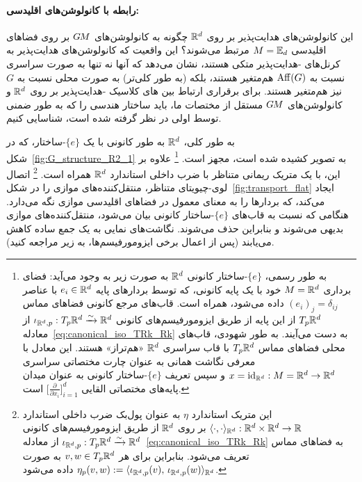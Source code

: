 \paragraph{رابطه با کانولوشن‌های  اقلیدسی:}
این کانولوشن‌های هدایت‌پذیر بر روی $\mathbb{R}^d$ چگونه به کانولوشن‌های $G\mkern-1.4muM$ بر روی فضاهای اقلیدسی ${M = \mathbb{E}_d}$ مرتبط می‌شوند؟
این واقعیت که کانولوشن‌های هدایت‌پذیر به کرنل‌های -هدایت‌پذیر متکی هستند، نشان می‌دهد که آنها نه تنها به صورت سراسری نسبت به $\operatorname{Aff}(G)$ هم‌متغیر هستند، بلکه (به طور کلی‌تر) به صورت محلی نسبت به $G$ نیز هم‌متغیر هستند.
برای برقراری ارتباط بین های کلاسیک -هدایت‌پذیر بر روی $\mathbb{R}^d$ و کانولوشن‌های $G\mkern-1.4muM$ مستقل از مختصات ما، باید ساختار هندسی را که به طور ضمنی توسط اولی در نظر گرفته شده است، شناسایی کنیم.


به طور کلی، $\mathbb{R}^d$ به طور کانونی با یک $\{e\}$-ساختار، که در شکل~\ref{fig:G_structure_R2_1} به تصویر کشیده شده است، مجهز است.%
\footnote{
	به طور رسمی، $\{e\}$-ساختار کانونی $\mathbb{R}^d$ به صورت زیر به وجود می‌آید:
	فضای برداری $M=\mathbb{R}^d$ خود با یک پایه کانونی، که توسط بردارهای پایه $e_i \in \mathbb{R}^d$ با عناصر $(e_i)_j = \delta_{ij}$ داده می‌شود، همراه است.
	قاب‌های مرجع کانونی فضاهای مماس $T_p\mathbb{R}^d$ از این پایه از طریق ایزومورفیسم‌های کانونی
	$\iota_{\mathbb{R}^d,p}: T_p{\mathbb{R}^d} \xrightarrow{\sim} \mathbb{R}^d$ از معادله~\eqref{eq:canonical_iso_TRk_Rk} به دست می‌آیند.
	به طور شهودی، قاب‌های محلی فضاهای مماس $T_p\mathbb{R}^d$ با قاب سراسری $\mathbb{R}^d$ «هم‌تراز» هستند.
	این معادل با معرفی نگاشت همانی به عنوان چارت مختصاتی سراسری $x = \mathrm{id}_{\mathbb{R}^d} : M=\mathbb{R}^d \to \mathbb{R}^d$ و سپس تعریف $\{e\}$-ساختار کانونی به عنوان میدان پایه‌های مختصاتی القایی $\big[\frac{\partial}{\partial x_i} \big]_{i=1}^d$ است.
}
علاوه بر این، با یک متریک ریمانی متناظر با ضرب داخلی استاندارد $\mathbb{R}^d$ همراه است.%
\footnote{
	این متریک استاندارد $\eta$ به عنوان پول‌بک ضرب داخلی استاندارد
	$\langle\cdot,\cdot\rangle_{\mathbb{R}^d}: \mathbb{R}^d\times\mathbb{R}^d \to \mathbb{R}$
	بر روی $\mathbb{R}^d$ از طریق ایزومورفیسم‌های کانونی
	$\iota_{\mathbb{R}^d,p}: T_p{\mathbb{R}^d} \xrightarrow{\sim} \mathbb{R}^d$ از معادله~\eqref{eq:canonical_iso_TRk_Rk}
	به فضاهای مماس تعریف می‌شود.
	بنابراین برای هر $v,w\in T_p\mathbb{R}^d$ به صورت
	${\eta_p(v,w) := \langle \iota_{\mathbb{R}^d,p}(v) ,\, \iota_{\mathbb{R}^d,p}(w) \rangle_{\mathbb{R}^d}}$ داده می‌شود.
}
اتصال لوی-چیویتای متناظر، منتقل‌کننده‌های موازی را در شکل~\ref{fig:transport_flat} ایجاد می‌کند، که بردارها را به معنای معمول در فضاهای اقلیدسی موازی نگه می‌دارد.
هنگامی که نسبت به قاب‌های $\{e\}$-ساختار کانونی بیان می‌شود، منتقل‌کننده‌های موازی بدیهی می‌شوند و بنابراین حذف می‌شوند.
نگاشت‌های نمایی به یک جمع ساده کاهش می‌یابند (پس از اعمال برخی ایزومورفیسم‌ها، به زیر مراجعه کنید).


